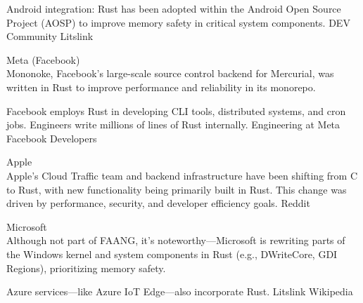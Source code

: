 \documentclass{article}
\begin{document}
Android integration: Rust has been adopted within the Android Open Source Project (AOSP) to improve
memory safety in critical system components. DEV Community Litslink

Meta (Facebook)\\
Mononoke, Facebook’s large-scale source control backend for Mercurial, was written in Rust to
improve performance and reliability in its monorepo.

Facebook employs Rust in developing CLI tools, distributed systems, and cron jobs. Engineers write
millions of lines of Rust internally. Engineering at Meta Facebook Developers

Apple\\
Apple’s Cloud Traffic team and backend infrastructure have been shifting from C to Rust, with new
functionality being primarily built in Rust. This change was driven by performance, security, and
developer efficiency goals. Reddit

Microsoft\\
Although not part of FAANG, it’s noteworthy—Microsoft is rewriting parts of the Windows kernel and
system components in Rust (e.g., DWriteCore, GDI Regions), prioritizing memory safety.

Azure services—like Azure IoT Edge—also incorporate Rust. Litslink Wikipedia
\end{document}
